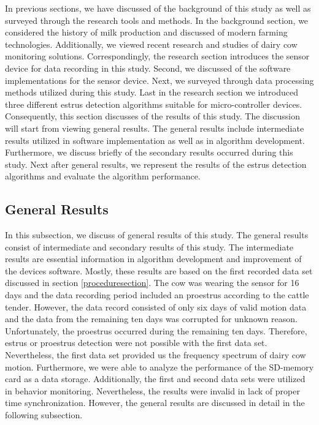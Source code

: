 \documentclass[english,12pt,a4paper,pdftex,elec,utf8]{aaltothesis}
\begin{document}
In previous sections, we have discussed of the background of this study as well as surveyed through the research tools and methods. In the background section, we considered the history of milk production and discussed of modern farming technologies. Additionally, we viewed recent research and studies of dairy cow monitoring solutions. Correspondingly, the research section introduces the sensor device for data recording in this study. Second, we discussed of the software implementations for the sensor device. Next, we surveyed through data processing methods utilized during this study. Last in the research section we introduced three different estrus detection algorithms suitable for micro-controller devices. Consequently, this section discusses of the results of this study. The discussion will start from viewing general results. The general results include intermediate results utilized in software implementation as well as in algorithm development. Furthermore, we discuss briefly of the secondary results occurred during this study. Next after general results, we represent the results of the estrus detection algorithms and evaluate the algorithm performance. 
 
\subsection{General Results} \label{generalresultssection}

In this subsection, we discuss of general results of this study. The general results consist of intermediate and secondary results of this study. The intermediate results are essential information in algorithm development and improvement of the devices software. Mostly, these results are based on the first recorded data set discussed in section \ref{proceduresection}. The cow was wearing the sensor for 16 days and the data recording period included an proestrus according to the cattle tender. However, the data record consisted of only six days of valid motion data and the data from the remaining ten days was corrupted for unknown reason. Unfortunately, the proestrus occurred during the remaining ten days. Therefore, estrus or proestrus detection were not possible with the first data set. Nevertheless, the first data set provided us the frequency spectrum of dairy cow motion. Furthermore, we were able to analyze the performance of the SD-memory card as a data storage. Additionally, the first and second data sets were utilized in behavior monitoring. Nevertheless, the results were invalid in lack of proper time synchronization. However, the general results are discussed in detail in the following subsection.
\end{document}
